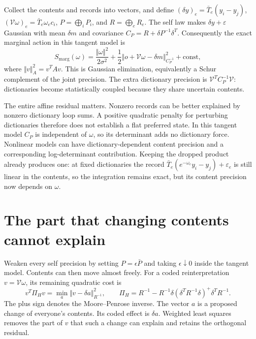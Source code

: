 Collect the contents and records into vectors, and define
$(\delta y)_e=\bar T_e(y_i-y_j)$,
$(\mathcal V\omega)_e=\bar T_e\omega_ec_i$,
$P=\bigoplus_iP_i$, and $R=\bigoplus_eR_e$.
The self law makes $\delta y+\varepsilon$ Gaussian with mean $\delta m$ and covariance $C_P=R+\delta P^{-1}\delta^T$. Consequently the exact marginal action in this tangent model is
\begin{equation}
S_{\mathrm{marg}}(\omega)
=\frac{\Vert\omega\Vert^2}{2\sigma^2}
+\frac12\Vert o+\mathcal V\omega-\delta m\Vert_{C_P^{-1}}^2
+\mathrm{const},
\label{c19:marginal}
\end{equation}
where $\Vert v\Vert_A^2=v^TAv$. This is Gaussian elimination, equivalently a Schur complement of the joint precision. The extra dictionary precision is $\mathcal V^TC_P^{-1}\mathcal V$: dictionaries become statistically coupled because they share uncertain contents.

The entire affine residual matters. Nonzero records can be better explained by nonzero dictionary loop sums. A positive quadratic penalty for perturbing dictionaries therefore does not establish a flat preferred state. In this tangent model $C_P$ is independent of $\omega$, so its determinant adds no dictionary force. Nonlinear models can have dictionary-dependent content precision and a corresponding log-determinant contribution. Keeping the dropped product already produces one: at fixed dictionaries the record $\bar T_e(e^{-\omega_e}y_i-y_j)+\varepsilon_e$ is still linear in the contents, so the integration remains exact, but its content precision now depends on $\omega$.

\section{The part that changing contents cannot explain}

Weaken every self precision by setting $P=\epsilon\bar P$ and taking $\epsilon\downarrow0$ inside the tangent model. Contents can then move almost freely. For a coded reinterpretation $v=\mathcal V\omega$, its remaining quadratic cost is
\begin{equation}
v^T\Pi_Hv=\min_a\Vert v-\delta a\Vert_{R^{-1}}^2,
\qquad
\Pi_H=R^{-1}-R^{-1}\delta(\delta^TR^{-1}\delta)^+\delta^TR^{-1}.
\label{c19:projection}
\end{equation}
The plus sign denotes the Moore--Penrose inverse. The vector $a$ is a proposed change of everyone's contents. Its coded effect is $\delta a$. Weighted least squares removes the part of $v$ that such a change can explain and retains the orthogonal residual.

